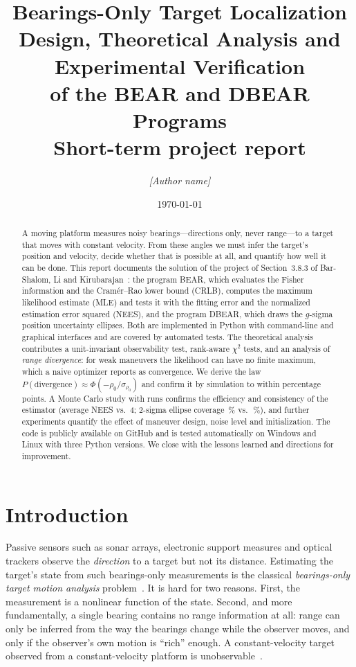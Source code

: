 \documentclass[11pt,a4paper]{article}
\title{\textbf{Bearings-Only Target Localization}\\[4pt]
       \large Design, Theoretical Analysis and Experimental Verification\\
       of the BEAR and DBEAR Programs\\[6pt]
       \normalsize Short-term project report}
\author{\textit{[Author name]}}
\date{\today}
\theoremstyle{plain}
\theoremstyle{remark}
\begin{document}
\maketitle

\begin{abstract}
\noindent
A moving platform measures noisy bearings---directions only, never range---to
a target that moves with constant velocity. From these angles we must infer
the target's position and velocity, decide whether that is possible at all,
and quantify how well it can be done. This report documents the solution of
the project of Section~3.8.3 of Bar-Shalom, Li and Kirubarajan~\cite{bsl01}:
the program BEAR, which evaluates the Fisher information and the Cram\'er--Rao
lower bound (CRLB), computes the maximum likelihood estimate (MLE) and tests
it with the fitting error and the normalized estimation error squared (NEES),
and the program DBEAR, which draws the $g$-sigma position uncertainty
ellipses. Both are implemented in Python with command-line and graphical
interfaces and are covered by \testsTotal{} automated tests. The theoretical
analysis contributes a unit-invariant observability test, rank-aware
$\chi^2$ tests, and an analysis of \emph{range divergence}: for weak
maneuvers the likelihood can have no finite maximum, which a naive optimizer
reports as convergence. We derive the law
$P(\text{divergence}) \approx \Phi(-\rho_0/\sigma_{\rho_0})$ and confirm it by
simulation to within \divProbMaxDev{} percentage points. A Monte Carlo study
with \mcRuns{} runs confirms the efficiency and consistency of the estimator
(average NEES \mcNeesMean{} vs.\ 4; 2-sigma ellipse coverage
\mcCoverTwo\,\% vs.\ \theoryCoverTwo\,\%), and further experiments quantify the
effect of maneuver design, noise level and initialization. The code is
publicly available on GitHub and is tested automatically on Windows and
Linux with three Python versions. We close with the lessons learned and
directions for improvement.
\end{abstract}

\tableofcontents
\newpage

\section{Introduction}
\label{sec:intro}

Passive sensors such as sonar arrays, electronic support measures and
optical trackers observe the \emph{direction} to a target but not its
distance. Estimating the target's state from such bearings-only measurements
is the classical \emph{bearings-only target motion analysis}
problem~\cite{nardone84,aidala83}. It is hard for two reasons. First, the
measurement is a nonlinear function of the state. Second, and more
fundamentally, a single bearing contains no range information at all: range
can only be inferred from the way the bearings change while the observer
moves, and only if the observer's own motion is ``rich'' enough. A
constant-velocity target observed from a constant-velocity platform is
unobservable~\cite{nardone81}.
\end{document}
